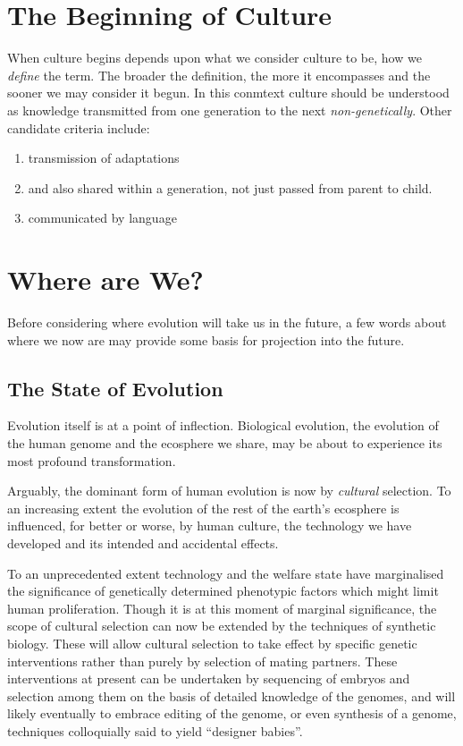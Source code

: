 \documentclass[10pt,titlepage]{book}
\begin{document}
\chapter{The Beginning of Culture}

When culture begins depends upon what we consider culture to be, how we \emph{define} the term.
The broader the definition, the more it encompasses and the sooner we may consider it begun.
In this conmtext culture should be understood as knowledge transmitted from one generation to the next \emph{non-genetically}.
Other candidate criteria include:

\begin{enumerate}
  \item transmission of adaptations
  \item and also shared within a generation, not just passed from parent to child.
  \item communicated by language
\end{enumerate}

\chapter{Where are We?}

Before considering where evolution will take us in the future, a few words about where we now are may provide some basis for projection into the future.

\section{The State of Evolution}

Evolution itself is at a point of inflection.
Biological evolution, the evolution of the human genome and the ecosphere we share, may be about to experience its most profound transformation.

Arguably, the dominant form of human evolution is now by \emph{cultural} selection.
To an increasing extent the evolution of the rest of the earth's ecosphere is influenced, for better or worse, by human culture, the technology we have developed and its intended and accidental effects.

To an unprecedented extent technology and the welfare state have marginalised the significance of genetically determined phenotypic factors which might limit human proliferation.
Though it is at this moment of marginal significance, the scope of cultural selection can now be extended by the techniques of synthetic biology.
These will allow cultural selection to take effect by specific genetic interventions rather than purely by selection of mating partners.
These interventions at present can be undertaken by sequencing of embryos and selection among them on the basis of detailed knowledge of the genomes, and will likely eventually to embrace editing of the genome, or even synthesis of a genome, techniques colloquially said to yield ``designer babies''.
\end{document}
